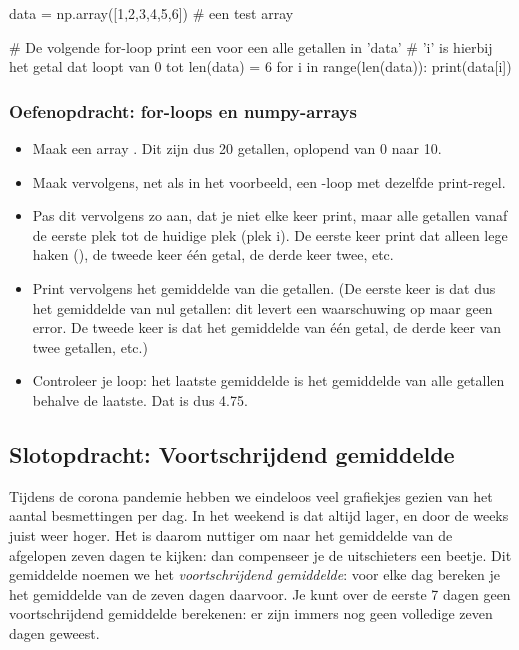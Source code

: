 \documentclass[a4paper,11pt, fleqn]{article}
\begin{document}
\begin{python}
data = np.array([1,2,3,4,5,6]) # een test array

# De volgende for-loop print een voor een alle getallen in 'data'
# 'i' is hierbij het getal dat loopt van 0 tot len(data) = 6
for i in range(len(data)):
    print(data[i])
\end{python}

\subsubsection*{Oefenopdracht: for-loops en numpy-arrays}
\begin{itemize}
	\item Maak een array . Dit zijn dus 20 getallen, oplopend van 0 naar 10.
	\item Maak vervolgens, net als in het voorbeeld, een -loop met dezelfde print-regel.
	\item Pas dit vervolgens zo aan, dat je niet elke keer  print, maar alle getallen vanaf de eerste plek tot de huidige plek (plek i). De eerste keer print dat alleen lege haken (\pythoninline{[]}), de tweede keer \'e\'en getal, de derde keer twee, etc.
	\item Print vervolgens het gemiddelde van die getallen. (De eerste keer is dat dus het gemiddelde van nul getallen: dit levert een waarschuwing op maar geen error. De tweede keer is dat het gemiddelde van \'e\'en getal, de derde keer van twee getallen, etc.)
	\item Controleer je loop: het laatste gemiddelde is het gemiddelde van alle getallen behalve de laatste. Dat is dus 4.75.
\end{itemize}
\fi

\subsection{Slotopdracht: Voortschrijdend gemiddelde}
Tijdens de corona pandemie hebben we eindeloos veel grafiekjes gezien van het aantal besmettingen per dag. In het weekend is dat altijd lager, en door de weeks juist weer hoger. Het is daarom nuttiger om naar het gemiddelde van de afgelopen zeven dagen te kijken: dan compenseer je de uitschieters een beetje. Dit gemiddelde noemen we het {\it voortschrijdend gemiddelde}: voor elke dag bereken je het gemiddelde van de zeven dagen daarvoor. Je kunt over de eerste 7 dagen geen voortschrijdend gemiddelde berekenen: er zijn immers nog geen volledige zeven dagen geweest.
\end{document}
